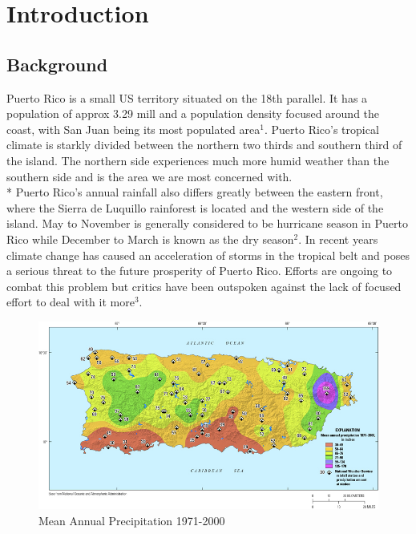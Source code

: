 \documentclass[a4paper,12pt]{article}
\begin{document}
\newpage


\tableofcontents
\newpage



\newpage

\pagestyle{style1}


\section{Introduction}

\subsection{Background}
Puerto Rico is a small US territory situated on the 18th parallel. It has a population of approx 3.29 mill and a population density focused around the coast,
with San Juan being its most populated area$^{1}$. Puerto Rico's tropical climate is starkly divided between the northern two thirds and southern third of the island.
The northern side experiences much more humid weather than the southern side and is the area we are most concerned with.\\* Puerto Rico's annual rainfall also differs greatly between the eastern front, where the Sierra de Luquillo rainforest is located and the western side of the island.
May to November is generally considered to be hurricane season in Puerto Rico while December to March is known as the dry season$^{2}$.
In recent years climate change has caused an acceleration of storms in the tropical belt and poses a serious threat to the future prosperity of Puerto Rico. Efforts are ongoing to combat this problem but critics have been outspoken against the lack
of focused effort to deal with it more$^{3}$.

\begin{figure}[h]
\centering
\includegraphics[scale =0.5]{Rainfall}
\caption{Mean Annual Precipitation 1971-2000}
\label{rainfall}
\end{figure}
\end{document}
